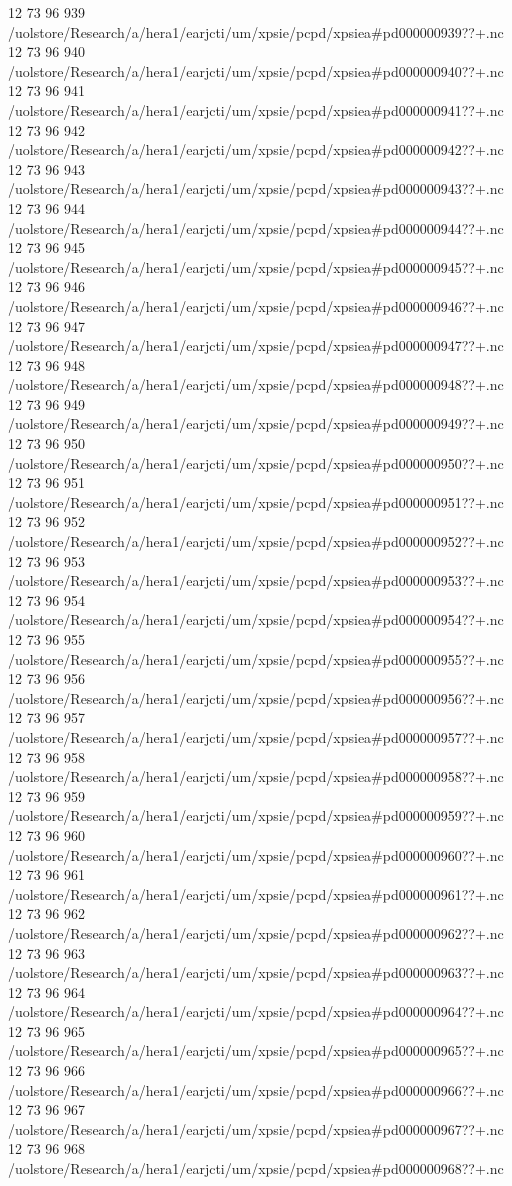 12 73 96
939
/uolstore/Research/a/hera1/earjcti/um/xpsie/pcpd/xpsiea#pd000000939??+.nc
12 73 96
940
/uolstore/Research/a/hera1/earjcti/um/xpsie/pcpd/xpsiea#pd000000940??+.nc
12 73 96
941
/uolstore/Research/a/hera1/earjcti/um/xpsie/pcpd/xpsiea#pd000000941??+.nc
12 73 96
942
/uolstore/Research/a/hera1/earjcti/um/xpsie/pcpd/xpsiea#pd000000942??+.nc
12 73 96
943
/uolstore/Research/a/hera1/earjcti/um/xpsie/pcpd/xpsiea#pd000000943??+.nc
12 73 96
944
/uolstore/Research/a/hera1/earjcti/um/xpsie/pcpd/xpsiea#pd000000944??+.nc
12 73 96
945
/uolstore/Research/a/hera1/earjcti/um/xpsie/pcpd/xpsiea#pd000000945??+.nc
12 73 96
946
/uolstore/Research/a/hera1/earjcti/um/xpsie/pcpd/xpsiea#pd000000946??+.nc
12 73 96
947
/uolstore/Research/a/hera1/earjcti/um/xpsie/pcpd/xpsiea#pd000000947??+.nc
12 73 96
948
/uolstore/Research/a/hera1/earjcti/um/xpsie/pcpd/xpsiea#pd000000948??+.nc
12 73 96
949
/uolstore/Research/a/hera1/earjcti/um/xpsie/pcpd/xpsiea#pd000000949??+.nc
12 73 96
950
/uolstore/Research/a/hera1/earjcti/um/xpsie/pcpd/xpsiea#pd000000950??+.nc
12 73 96
951
/uolstore/Research/a/hera1/earjcti/um/xpsie/pcpd/xpsiea#pd000000951??+.nc
12 73 96
952
/uolstore/Research/a/hera1/earjcti/um/xpsie/pcpd/xpsiea#pd000000952??+.nc
12 73 96
953
/uolstore/Research/a/hera1/earjcti/um/xpsie/pcpd/xpsiea#pd000000953??+.nc
12 73 96
954
/uolstore/Research/a/hera1/earjcti/um/xpsie/pcpd/xpsiea#pd000000954??+.nc
12 73 96
955
/uolstore/Research/a/hera1/earjcti/um/xpsie/pcpd/xpsiea#pd000000955??+.nc
12 73 96
956
/uolstore/Research/a/hera1/earjcti/um/xpsie/pcpd/xpsiea#pd000000956??+.nc
12 73 96
957
/uolstore/Research/a/hera1/earjcti/um/xpsie/pcpd/xpsiea#pd000000957??+.nc
12 73 96
958
/uolstore/Research/a/hera1/earjcti/um/xpsie/pcpd/xpsiea#pd000000958??+.nc
12 73 96
959
/uolstore/Research/a/hera1/earjcti/um/xpsie/pcpd/xpsiea#pd000000959??+.nc
12 73 96
960
/uolstore/Research/a/hera1/earjcti/um/xpsie/pcpd/xpsiea#pd000000960??+.nc
12 73 96
961
/uolstore/Research/a/hera1/earjcti/um/xpsie/pcpd/xpsiea#pd000000961??+.nc
12 73 96
962
/uolstore/Research/a/hera1/earjcti/um/xpsie/pcpd/xpsiea#pd000000962??+.nc
12 73 96
963
/uolstore/Research/a/hera1/earjcti/um/xpsie/pcpd/xpsiea#pd000000963??+.nc
12 73 96
964
/uolstore/Research/a/hera1/earjcti/um/xpsie/pcpd/xpsiea#pd000000964??+.nc
12 73 96
965
/uolstore/Research/a/hera1/earjcti/um/xpsie/pcpd/xpsiea#pd000000965??+.nc
12 73 96
966
/uolstore/Research/a/hera1/earjcti/um/xpsie/pcpd/xpsiea#pd000000966??+.nc
12 73 96
967
/uolstore/Research/a/hera1/earjcti/um/xpsie/pcpd/xpsiea#pd000000967??+.nc
12 73 96
968
/uolstore/Research/a/hera1/earjcti/um/xpsie/pcpd/xpsiea#pd000000968??+.nc
